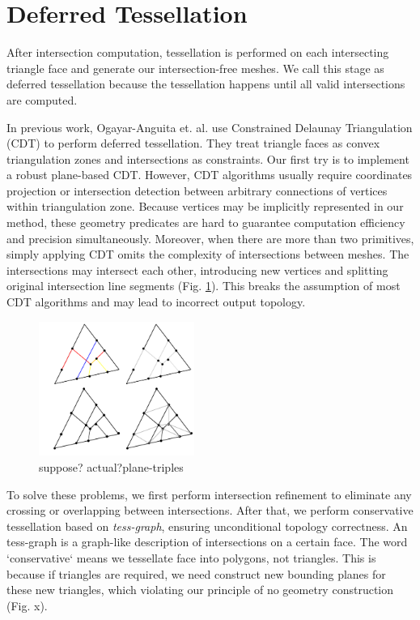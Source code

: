 \documentclass[10pt,journal,compsoc]{IEEEtran}
\begin{document}
\section{Deferred Tessellation}



\label{sec:tessellation}
After intersection computation, tessellation is performed on each intersecting triangle face and generate our intersection-free meshes. We call this stage as deferred tessellation because the tessellation happens until all valid intersections are computed.

In previous work, Ogayar-Anguita et. al. \cite{ogayar2015deferred} use Constrained Delaunay Triangulation (CDT) to perform deferred tessellation. They treat triangle faces as convex triangulation zones and intersections as constraints. Our first try is to implement a robust plane-based CDT. However, CDT algorithms \cite{chew1989constrained,preparata2012computational} usually require coordinates projection or intersection detection between arbitrary connections of vertices within triangulation zone. Because vertices may be implicitly represented in our method, these geometry predicates are hard to guarantee computation efficiency and precision simultaneously. Moreover, when there are more than two primitives, simply applying CDT omits the complexity of intersections between meshes. The intersections may intersect each other, introducing new vertices and splitting original intersection line segments (Fig. \ref{fig:iisect}). This breaks the assumption of most CDT algorithms and may lead to incorrect output topology.

\begin{figure}[t]
\centering
\includegraphics[width=2in]{iisect}
\caption{suppose? actual?plane-triples}
\label{fig:iisect}
\end{figure}

To solve these problems, we first perform intersection refinement to eliminate any crossing or overlapping between intersections. After that, we perform conservative tessellation based on \emph{tess-graph}, ensuring unconditional topology correctness. An tess-graph is a graph-like description of intersections on a certain face. The word `conservative` means we tessellate face into polygons, not triangles. This is because if triangles are required, we need construct new bounding planes for these new triangles, which violating our principle of no geometry construction (Fig. x).
\end{document}
